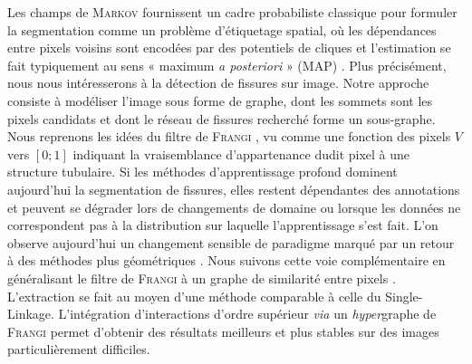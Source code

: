 \documentclass{these-ISSS} %
\begin{document}
\begin{enumerate}
    Les champs de \textsc{Markov} fournissent un cadre probabiliste classique pour formuler la segmentation comme un problème d’étiquetage spatial, où les dépendances entre pixels voisins sont encodées par des potentiels de cliques et l'estimation se fait typiquement au sens « maximum \emph{a posteriori} » (MAP) \cite{KatoZerubia}.
    Plus précisément, nous nous intéresserons à la détection de fissures sur image. Notre approche consiste à modéliser l'image sous forme de graphe, dont les sommets sont les pixels candidats et dont le réseau de fissures recherché forme un sous-graphe. %
    Nous reprenons les idées du filtre de \textsc{Frangi} \cite{Frangi1998}, vu comme une fonction des pixels $V $ vers $ [0 ; 1]$ indiquant la vraisemblance d'appartenance dudit pixel à une structure tubulaire.
    Si les méthodes d'apprentissage profond dominent aujourd'hui la segmentation de fissures, elles restent dépendantes des annotations et peuvent se dégrader lors de changements de domaine ou lorsque les données ne correspondent pas à la distribution sur laquelle l'apprentissage s'est fait. L'on observe aujourd'hui un changement sensible de paradigme marqué par un retour à des méthodes plus géométriques \cite{Zhang2025Review}. Nous suivons cette voie complémentaire %
    en généralisant le filtre de \textsc{Frangi} à un graphe de similarité entre pixels \cite{BibiStrasbourg,BibiISPRS}. L'extraction se fait au moyen d'une méthode comparable à celle du Single-Linkage. L'intégration d'interactions d'ordre supérieur \emph{via} un \emph{hyper}graphe de \textsc{Frangi} permet d'obtenir des résultats meilleurs et plus stables sur des images particulièrement difficiles.
\end{enumerate}





\end{document}
